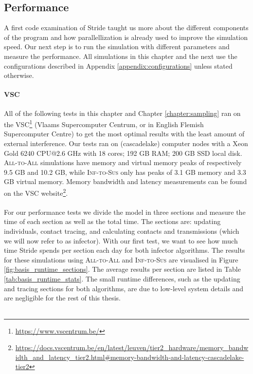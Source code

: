 \subsection{Performance}
\label{subsec:performance}
A first code examination of Stride taught us more about the different components of the program and how parallellization is already used to improve the simulation speed. Our next step is to run the simulation with different parameters and measure the performance. All simulations in this chapter and the next use the configurations described in Appendix \ref{appendix:configurations} unless stated otherwise. \paragraph{VSC} All of the following tests in this chapter and Chapter \ref{chapter:sampling} ran on the VSC\footnote{\url{https://www.vscentrum.be/}} (Vlaams Supercomputer Centrum, or in English Flemish Supercomputer Centre) to get the most optimal results with the least amount of external interference. Our tests ran on (cascadelake) computer nodes with a Xeon Gold 6240 CPU@2.6 GHz with 18 cores; 192 GB RAM; 200 GB SSD local disk. \textsc{All-to-All} simulations have memory and virtual memory peaks of respectively 9.5 GB and 10.2 GB, while \textsc{Inf-to-Sus} only has peaks of 3.1 GB memory and 3.3 GB virtual memory. Memory bandwidth and latency measurements can be found on the VSC website\footnote{\url{https://docs.vscentrum.be/en/latest/leuven/tier2_hardware/memory_bandwidth_and_latency_tier2.html\#memory-bandwidth-and-latency-cascadelake-tier2}}.
\\\\
For our performance tests we divide the model in three sections and measure the time of each section as well as the total time. The sections are: updating individuals, contact tracing, and calculating contacts and transmissions (which we will now refer to as infector). With our first test, we want to see how much time Stride spends per section each day for both infector algorithms. The results for these simulations using \textsc{All-to-All} and \textsc{Inf-to-Sus} are visualised in Figure \ref{fig:basis_runtime_sections}. The average results per section are listed in Table \ref{tab:basis_runtime_stats}. The small runtime differences, such as the updating and tracing sections for both algorithms, are due to low-level system details and are negligible for the rest of this thesis.
\\\\
